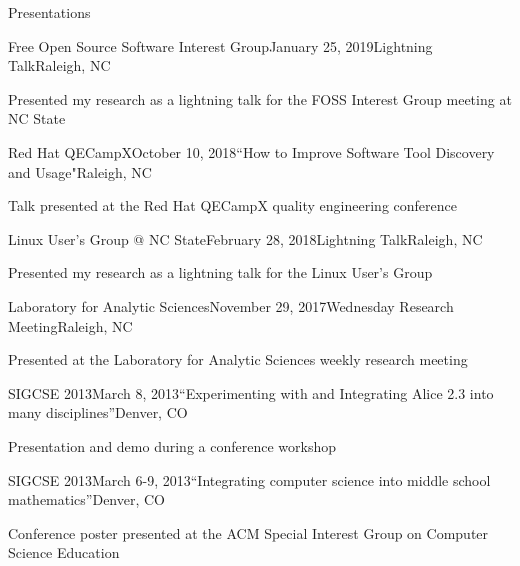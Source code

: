 \documentclass{resume} %
\begin{document}

\begin{rSection}{Presentations}

\begin{rSubsection}{Free Open Source Software Interest Group}{January 25, 2019}{Lightning Talk}{Raleigh, NC}
\item Presented my research as a lightning talk for the FOSS Interest Group meeting at NC State
\end{rSubsection}


\begin{rSubsection}{Red Hat QECampX}{October 10, 2018}{``How to Improve Software Tool Discovery and Usage"}{Raleigh, NC}
\item Talk presented at the Red Hat QECampX quality engineering conference
\end{rSubsection}

\begin{rSubsection}{Linux User's Group @ NC State}{February 28, 2018}{Lightning Talk}{Raleigh, NC}
\item Presented my research as a lightning talk for the Linux User's Group
\end{rSubsection}

\begin{rSubsection}{Laboratory for Analytic Sciences}{November 29, 2017}{Wednesday Research Meeting}{Raleigh, NC}
\item Presented at the Laboratory for Analytic Sciences weekly research meeting
\end{rSubsection}


\begin{rSubsection}{SIGCSE 2013}{March 8, 2013}{``Experimenting with and Integrating Alice 2.3 into many disciplines''}{Denver, CO}
\item Presentation and demo during a conference workshop
\end{rSubsection}


\begin{rSubsection}{SIGCSE 2013}{March 6-9, 2013}{``Integrating computer science into middle school mathematics''}{Denver, CO}
\item Conference poster presented at the ACM Special Interest Group on Computer Science Education
\end{rSubsection}

\end{rSection}
\end{document}

